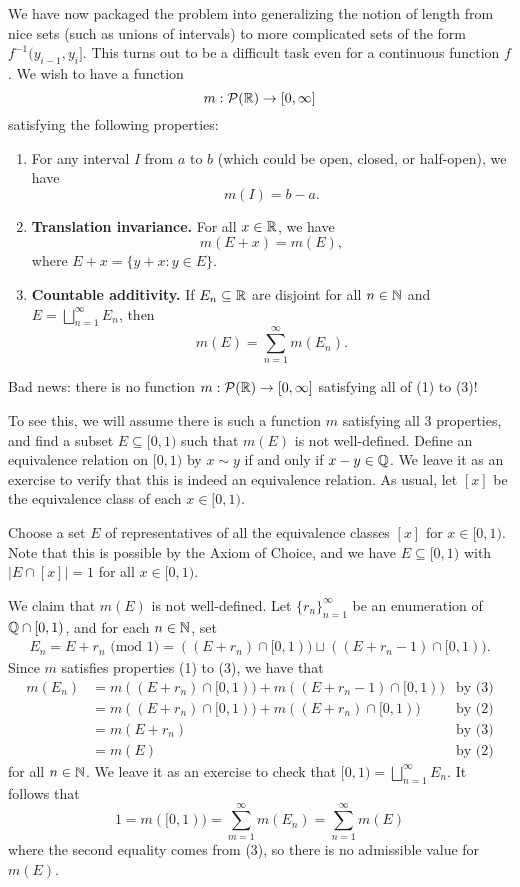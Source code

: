 We have now packaged the problem into generalizing the notion of length 
from nice sets (such as unions of intervals) to more complicated sets 
of the form $f^{-1}(y_{i-1}, y_i]$. This turns out to be a difficult task 
even for a continuous function $f$. We wish to have a function 
\[ m : {\cal P}(\mathbb{R}) \to [0, \infty] \] 
satisfying the following properties: 
\begin{enumerate}[(1)]
    \item For any interval $I$ from $a$ to $b$ (which could be open, closed, 
    or half-open), we have 
    \[ m(I) = b-a. \] 
    \item {\bf Translation invariance.} For all $x \in \mathbb{R}$, we have 
    \[ m(E + x) = m(E), \] 
    where $E + x = \{y + x : y \in E\}$. 
    \item {\bf Countable additivity.} If $E_n \subseteq \mathbb{R}$ are disjoint 
    for all $n \in \mathbb{N}$ and $E = \bigsqcup_{n=1}^\infty E_n$, then 
    \[ m(E) = \sum_{n=1}^\infty m(E_n). \] 
\end{enumerate}
Bad news: there is no function $m : {\cal P}(\mathbb{R}) \to [0, \infty]$ 
satisfying all of (1) to (3)! 

To see this, we will assume there is such a function $m$ satisfying all $3$ 
properties, and find a subset $E \subseteq [0, 1)$ such that $m(E)$ is not 
well-defined. Define an equivalence relation on $[0, 1)$ by $x \sim y$ 
if and only if $x - y \in \mathbb{Q}$. We leave it as an exercise to verify that 
this is indeed an equivalence relation. As usual, let $[x]$ be the 
equivalence class of each $x \in [0, 1)$. 

Choose a set $E$ of representatives of all the equivalence classes $[x]$ for 
$x \in [0, 1)$. Note that this is possible by the Axiom of Choice, and we have 
$E \subseteq [0, 1)$ with $|E \cap [x]| = 1$ for all $x \in [0, 1)$. 

We claim that $m(E)$ is not well-defined. Let $\{r_n\}_{n=1}^\infty$ be 
an enumeration of $\mathbb{Q} \cap [0, 1)$, and for each $n \in \mathbb{N}$, set 
\begin{align*}
    E_n = E + r_n \text{ (mod $1$)} = ((E + r_n) \cap [0, 1)) \sqcup 
    ((E + r_n - 1) \cap [0, 1)). 
\end{align*}
Since $m$ satisfies properties (1) to (3), we have that 
\begin{align*}
    m(E_n) &= m((E + r_n) \cap [0, 1)) + m((E + r_n - 1) \cap [0, 1)) & 
    \text{by (3)} \\ 
    &= m((E + r_n) \cap [0, 1)) + m((E + r_n) \cap [0, 1)) & \text{by (2)} \\ 
    &= m(E + r_n) & \text{by (3)} \\ 
    &= m(E) & \text{by (2)}
\end{align*}
for all $n \in \mathbb{N}$. We leave it as an exercise to check that $[0, 1) = 
\bigsqcup_{n=1}^\infty E_n$. It follows that 
\[ 1 = m([0, 1)) = \sum_{m=1}^\infty m(E_n) = \sum_{n=1}^\infty m(E) \] 
where the second equality comes from (3), so there is no admissible value for 
$m(E)$. 

